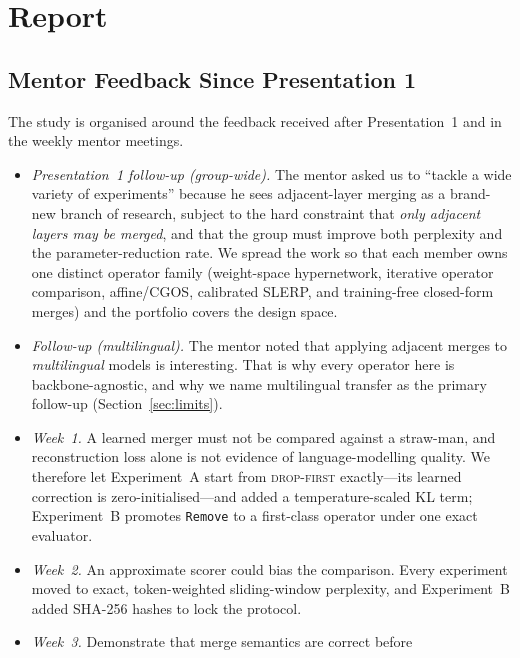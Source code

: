 \documentclass[10pt,a4paper]{article}
\newcommand{\dropfirst}{\textsc{drop-first}}
\newcommand{\removeop}{\texttt{Remove}}
\begin{document}
\section{Report}

\subsection{Mentor Feedback Since Presentation 1}
\label{sec:feedback}

The study is organised around the feedback received after Presentation~1 and in
the weekly mentor meetings.

\begin{itemize}
  \item \emph{Presentation~1 follow-up (group-wide).} The mentor asked us to
    ``tackle a wide variety of experiments'' because he sees adjacent-layer
    merging as a brand-new branch of research, subject to the hard constraint that
    \emph{only adjacent layers may be merged}, and that the group must improve
    both perplexity and the parameter-reduction rate. We spread the work so
    that each member owns one distinct operator family (weight-space
    hypernetwork, iterative operator comparison, affine/CGOS, calibrated SLERP,
    and training-free closed-form merges) and the portfolio covers the design
    space.
  \item \emph{Follow-up (multilingual).} The mentor noted that applying
    adjacent merges to \emph{multilingual} models is interesting. That is why
    every operator here is backbone-agnostic, and why we name multilingual
    transfer as the primary follow-up (Section~\ref{sec:limits}).
  \item \emph{Week~1.} A learned merger must not be compared against a
    straw-man, and reconstruction loss alone is not evidence of
    language-modelling quality. We therefore let Experiment~A start from
    \dropfirst{} exactly---its learned correction is zero-initialised---and
    added a temperature-scaled KL term; Experiment~B promotes \removeop{} to a
    first-class operator under one exact evaluator.
  \item \emph{Week~2.} An approximate scorer could bias the comparison.
    Every experiment moved to exact, token-weighted sliding-window perplexity,
    and Experiment~B added SHA-256 hashes to lock the protocol.
  \item \emph{Week~3.} Demonstrate that merge semantics are correct before

\end{itemize}
\end{document}
